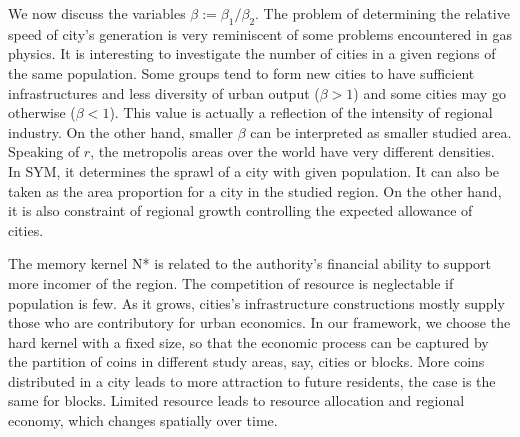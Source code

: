 \documentclass[reprint,unsortedaddress,amsmath,amssymb,aps,prl,showkeys]{revtex4-2}
\begin{document}
We now discuss the variables $\beta:=\beta_1/\beta_2$. The problem of determining the relative speed of city's generation is very reminiscent of some problems encountered in gas physics. It is interesting to investigate the number of cities in a given regions of the same population. Some groups tend to form new cities to have sufficient infrastructures and less diversity of urban output ($\beta > 1$) and some cities may go otherwise ($\beta< 1$). This value is actually a reflection of the intensity of regional industry. On the other hand, smaller $\beta$ can be interpreted as smaller studied area. Speaking of $r$, the metropolis areas over the world have very different densities. In SYM, it determines the sprawl of a city with given population. It can also be taken as the area proportion for a city in the studied region. On the other hand, it is also constraint of regional growth controlling the expected allowance of cities. %

The memory kernel N* is related to the authority's financial ability to support more incomer of the region. The competition of resource is neglectable if population is few. As it grows, cities's infrastructure constructions mostly supply those who are contributory for urban economics. In our framework, we choose the hard kernel with a fixed size, so that the economic process can be captured by the partition of coins in different study areas, say, cities or blocks. More coins distributed in a city leads to more attraction to future residents, the case is the same for blocks. Limited resource leads to resource allocation and regional economy, which changes spatially over time. 
\end{document}
